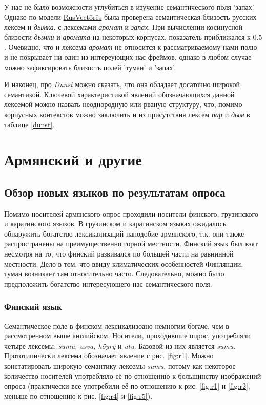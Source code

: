 \par У нас не было возможности углубиться в изучение семантического поля 'запах'. Однако по модели \hyperlink{rusvectores}{RusVectōrēs} была проверена семантическая близость русских лексем  и \textit{дымка}, с лексемами \textit{аромат} и \textit{запах}. При вычислении косинусной близости \textit{дымки} и \textit{аромата} на некоторых корпусах, показатель приближался к $0.5$. Очевидно, что и лексема \textit{аромат} не относится к рассматриваемому нами полю и не покрывает ни один из интереующих нас фреймов, однако в любом случае можно зафиксировать близость полей 'туман' и 'запах'.

\par И наконец, про \textit{Dunst} можно сказать, что она обладает досаточно широкой семантикой. Ключевой характеристикой явлений обозначающихся данной лексемой можно назвать неоднородную или рваную структуру, что, помимо корпусных контекстов можно заключить и из присутствия лексем \textit{пар} и \textit{дым} в таблице \ref{dunst}.

\section{Армянский и другие} \label{армянский}
\subsection{Обзор новых языков по результатам опроса}

\par Помимо носителей армянского опрос проходили носители финского, грузинского и каратинского языков. В грузинском и каратинском языках ожидалось обнаружить богатство лексикализаций наподобие армянского, т.к. они также распространены на преимущественно горной местности. Финский язык был взят несмотря на то, что финский развивался по большей части на равнинной местности. Дело в том, что ввиду климатических особенностей Финляндии, туман возникает там относительно часто. Следовательно, можно было предположить богатство интересующего нас семантического поля.

\subsubsection{Финский язык}

\par Семантическое поле в финском лексикализоано немногим богаче, чем в рассмотренном выше английском. Носители, проходившие опрос, употребляли четыре лексемы: \textit{sumu, usva, höyry} и \textit{utu}. Базовой из них является \textit{sumu}. Прототипически лексема обозначает явление с рис. \ref{fig:r1}. Можно констатировать широкую семантику лексемы \textit{sumu}, потому как некоторое количество носителей употребляло её по отношению к большинству изображений опроса (практически все употребили её по отношению к рис. \ref{fig:r1} и \ref{fig:r2}, меньше по отношению к рис. \ref{fig:r4} и \ref{fig:r5}).

